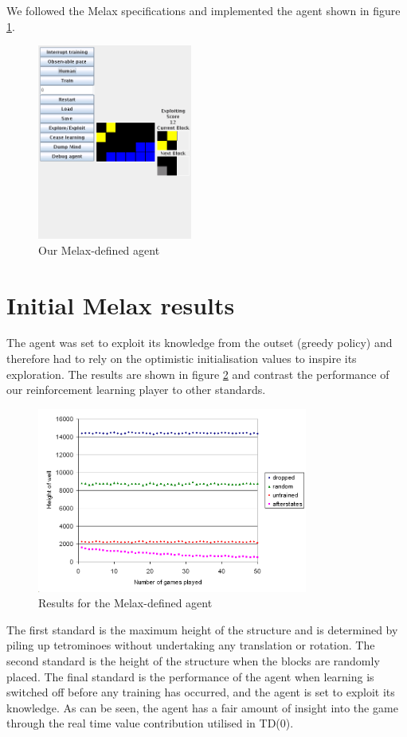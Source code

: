 \documentclass{rucsthesis}
\begin{document}
We followed the Melax specifications and implemented the agent shown in figure \ref{fig:mymelax}.

\begin{figure}[h]
\centering
\includegraphics[width=2in]{mymelax.png}
\caption{Our Melax-defined agent}
\label{fig:mymelax}
\end{figure}

\section{Initial Melax results}

The agent was set to exploit its knowledge from the outset (greedy policy) and therefore had to rely on the optimistic initialisation values to inspire its exploration. The results are shown in figure \ref{fig:mymelaxresults} and contrast the performance of our reinforcement learning player to other standards. 

\begin{figure}[h]
\centering
\includegraphics[width=3.5in]{mymelaxresults.png}
\caption{Results for the Melax-defined agent}
\label{fig:mymelaxresults}
\end{figure}

The first standard is the maximum height of the structure and is determined by piling up tetrominoes without undertaking any translation or rotation. The second standard is the height of the structure when the blocks are randomly placed. The final standard is the performance of the agent when learning is switched off before any training has occurred, and the agent is set to exploit its knowledge. As can be seen, the agent has a fair amount of insight into the game through the real time value contribution utilised in TD(0).
\end{document}
